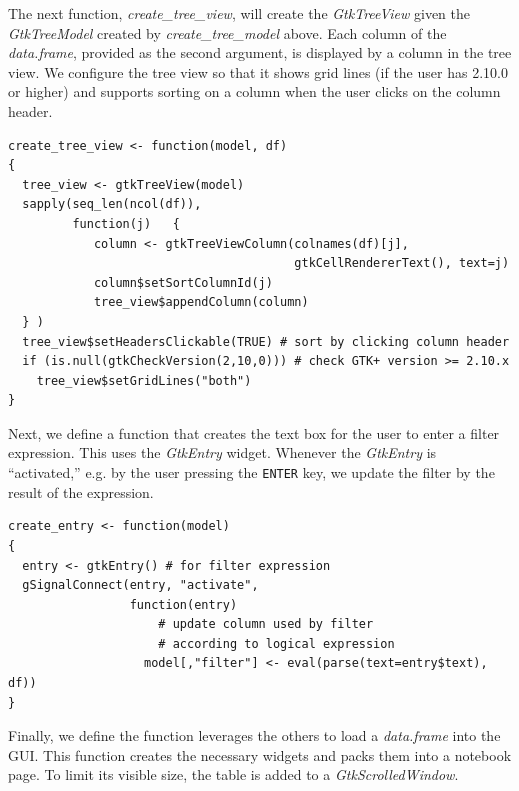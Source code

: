 \documentclass[article]{jss}
\begin{document}
The next function, \emph{create_tree_view},  will create the
\emph{GtkTreeView} given the \emph{GtkTreeModel} created by
\emph{create_tree_model} above. Each column of the \emph{data.frame},
provided as the second argument, is displayed by a column in the tree
view. We configure the tree view so that it shows grid lines (if the
user has  2.10.0 or higher) and supports sorting on a column
when the user clicks on the column header.
\begin{verbatim}
create_tree_view <- function(model, df)
{
  tree_view <- gtkTreeView(model)
  sapply(seq_len(ncol(df)),
         function(j)   {
            column <- gtkTreeViewColumn(colnames(df)[j], 
                                        gtkCellRendererText(), text=j)
            column$setSortColumnId(j)
            tree_view$appendColumn(column)
  } )
  tree_view$setHeadersClickable(TRUE) # sort by clicking column header
  if (is.null(gtkCheckVersion(2,10,0))) # check GTK+ version >= 2.10.x
    tree_view$setGridLines("both")
}
\end{verbatim}
Next, we define a function that creates the text box for the user to
enter a filter expression. This uses the \emph{GtkEntry} widget.
Whenever the \emph{GtkEntry} is ``activated,'' e.g. by the user
pressing the \texttt{ENTER} key, we update the filter by the result of
the  expression.
\begin{verbatim}
create_entry <- function(model)
{
  entry <- gtkEntry() # for filter expression
  gSignalConnect(entry, "activate", 
                 function(entry)
                     # update column used by filter 
                     # according to logical expression
                   model[,"filter"] <- eval(parse(text=entry$text),
df))
}
\end{verbatim}
Finally, we define the function leverages the others to load a \emph{data.frame} into the GUI. This function creates the necessary widgets and packs them into a notebook page. To limit its visible size, the table is added to a \emph{GtkScrolledWindow}.
\end{document}
